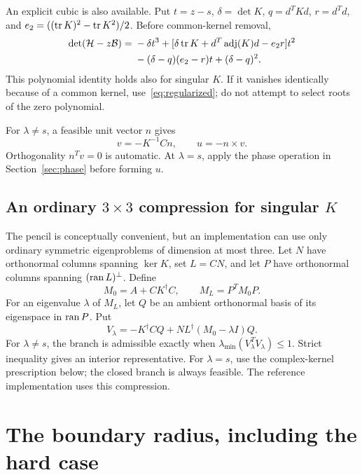 An explicit cubic is also available. Put $t=z-s$, $\delta=\det K$, $q=d^TKd$, $r=d^Td$, and $e_2=((\operatorname{tr} K)^2-\operatorname{tr} K^2)/2$. Before common-kernel removal,
\begin{align}
 \det(\mathcal H-z\mathcal B)
 ={}&-\delta t^3+
 [\delta\operatorname{tr} K+d^T\operatorname{adj}(K)d-e_2r]t^2\notag\\
 &-(\delta-q)(e_2-r)t+(\delta-q)^2.
 \label{eq:explicitcubic}
\end{align}
This polynomial identity holds also for singular $K$. If it vanishes identically because of a common kernel, use~\eqref{eq:regularized}; do not attempt to select roots of the zero polynomial.

For $\lambda\ne s$, a feasible unit vector $n$ gives
\begin{equation}
 v=-K^{-1}Cn,\qquad u=-n\times v.
 \label{eq:genericfilter}
\end{equation}
Orthogonality $n^Tv=0$ is automatic. At $\lambda=s$, apply the phase operation in Section~\ref{sec:phase} before forming $u$.

\subsection{An ordinary $3\times3$ compression for singular $K$}
The pencil is conceptually convenient, but an implementation can use only ordinary symmetric eigenproblems of dimension at most three. Let $N$ have orthonormal columns spanning $\ker K$, set $L=CN$, and let $P$ have orthonormal columns spanning $(\operatorname{ran} L)^\perp$. Define
\begin{equation}
 M_0=A+CK^\dagger C,\qquad M_L=P^TM_0P.
 \label{eq:compressed}
\end{equation}
For an eigenvalue $\lambda$ of $M_L$, let $Q$ be an ambient orthonormal basis of its eigenspace in $\operatorname{ran} P$. Put
\begin{equation}
 V_\lambda=-K^\dagger CQ+NL^\dagger(M_0-\lambda I)Q.
 \label{eq:V}
\end{equation}
For $\lambda\ne s$, the branch is admissible exactly when
$\lambda_{\min}(V_\lambda^TV_\lambda)\le1$. Strict inequality gives an interior representative. For $\lambda=s$, use the complex-kernel prescription below; the closed branch is always feasible. The reference implementation uses this compression.

\section{The boundary radius, including the hard case}
\label{sec:boundary}

